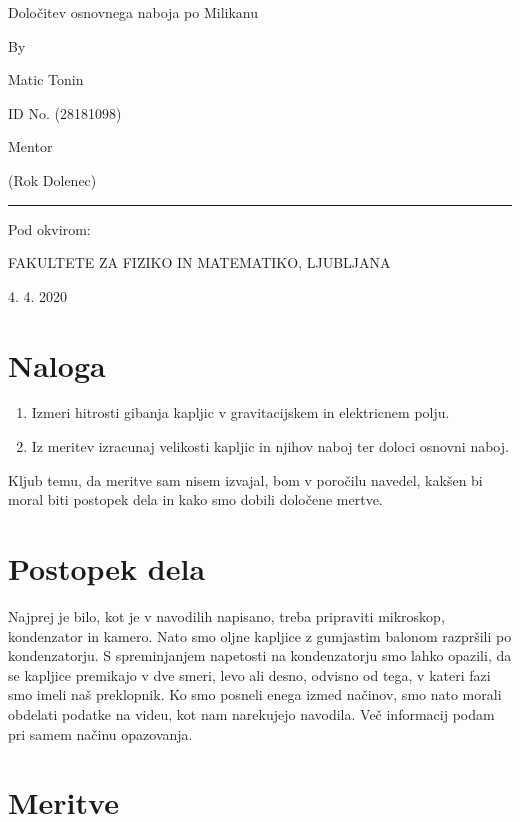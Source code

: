 \documentclass[11pt, a4paper]{article}
\theoremstyle{definition}
\theoremstyle{example}
\theoremstyle{izrek}
\begin{document}
\begin{center}
\thispagestyle{empty}
\parskip=14pt%
\vspace*{3\parskip}%
\begin{Huge} Določitev osnovnega naboja po Milikanu \end{Huge}

By

Matic Tonin

ID No. (28181098)

Mentor 

(Rok Dolenec)

\rule{7cm}{0.4pt}

Pod okvirom:

FAKULTETE ZA FIZIKO IN MATEMATIKO, LJUBLJANA

4. 4. 2020

\end{center}
\pagebreak
\section{Naloga}
\begin{enumerate}
\item Izmeri hitrosti gibanja kapljic v gravitacijskem in elektricnem polju.
\item Iz meritev izracunaj velikosti kapljic in njihov naboj ter doloci osnovni naboj.
\end{enumerate}

Kljub temu, da meritve sam nisem izvajal, bom v poročilu navedel, kakšen bi moral biti postopek dela in kako smo dobili določene mertve. \\

\section{Postopek dela}
Najprej je bilo, kot je v navodilih napisano, treba pripraviti mikroskop, kondenzator in kamero. Nato smo oljne kapljice z gumjastim balonom razpršili po kondenzatorju. S spreminjanjem napetosti na kondenzatorju smo lahko opazili, da se kapljice premikajo v dve smeri, levo ali desno, odvisno od tega, v kateri fazi smo imeli naš preklopnik. Ko smo posneli enega izmed načinov, smo nato morali obdelati podatke na videu, kot nam narekujejo navodila. Več informacij podam pri samem načinu opazovanja. 

\section{Meritve}
\end{document}
